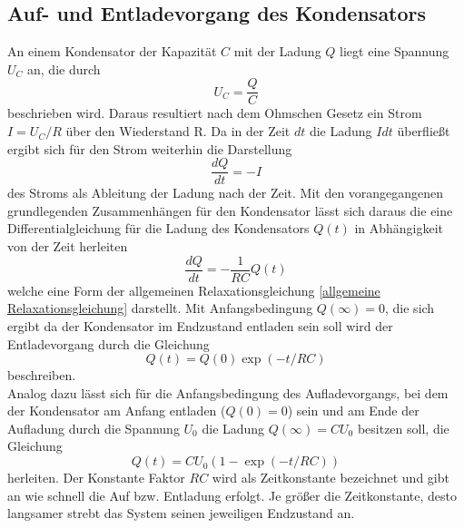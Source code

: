 \subsection{Auf- und Entladevorgang des Kondensators}
An einem Kondensator der Kapazität $C$ mit der Ladung $Q$ liegt eine Spannung $U_C$ an, die durch
\begin{equation*}
U_C=\frac{Q}{C}
\end{equation*}
beschrieben wird. Daraus resultiert nach dem Ohmschen Gesetz ein Strom $I=U_C/R$ über den Wiederstand R. Da in der Zeit $dt$ die Ladung 
$Idt$ überfließt ergibt sich für den Strom weiterhin die Darstellung
\begin{equation*}
\frac{dQ}{dt}=-I
\end{equation*}
des Stroms als Ableitung der Ladung nach der Zeit. Mit den vorangegangenen grundlegenden Zusammenhängen für den Kondensator lässt sich daraus die 
eine Differentialgleichung für die Ladung des Kondensators $Q(t)$ in Abhängigkeit von der Zeit herleiten
\begin{equation}
\frac{dQ}{dt}=-\frac{1}{RC}Q(t)
\end{equation}
welche eine Form der allgemeinen Relaxationsgleichung \ref{allgemeine Relaxationsgleichung} darstellt. Mit Anfangsbedingung $Q(\infty)=0$, die sich ergibt da der 
Kondensator im Endzustand entladen sein soll wird der Entladevorgang durch die Gleichung
\begin{equation}
Q(t)=Q(0)\exp (-t/RC)
\end{equation}
beschreiben. \\
Analog dazu lässt sich für die Anfangsbedingung des Aufladevorgangs, bei dem der Kondensator am Anfang entladen ($Q(0)=0$) sein und am Ende der Aufladung durch die
Spannung $U_0$ die Ladung $Q(\infty)=CU_0$ besitzen soll, die Gleichung 
\begin{equation}
Q(t)=CU_0(1-\exp(-t/RC))
\end{equation}
herleiten. Der Konstante Faktor $RC$ wird als Zeitkonstante bezeichnet und gibt an wie schnell die Auf bzw. Entladung erfolgt. Je größer die Zeitkonstante,
desto langsamer strebt das System seinen jeweiligen Endzustand an.
